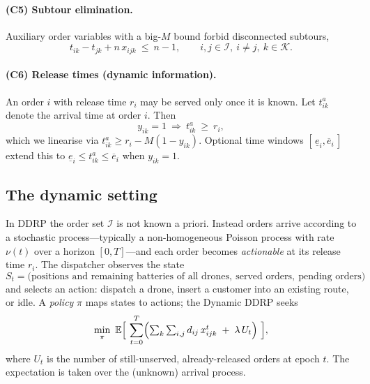 \documentclass[11pt,a4paper]{article}
\newcommand{\E}{\mathbb{E}}
\begin{document}
\paragraph{(C5) Subtour elimination.}
Auxiliary order variables with a big-$M$ bound forbid disconnected subtours,
\begin{equation}
  t_{ik} - t_{jk} + n\,x_{ijk} \ \le \ n-1,
  \qquad i,j\in\mathcal{I},\ i\neq j,\ k\in\mathcal{K}.
  \label{eq:ddrp-mtz}
\end{equation}

\paragraph{(C6) Release times (dynamic information).}
An order $i$ with release time $r_{i}$ may be served only once it is known. Let
$t^{a}_{ik}$ denote the arrival time at order $i$. Then
\begin{equation}
  y_{ik} = 1 \ \Rightarrow \ t^{a}_{ik} \ \ge \ r_{i},
  \label{eq:ddrp-release}
\end{equation}
which we linearise via $t^{a}_{ik} \ge r_{i} - M(1-y_{ik})$. Optional time
windows $[\,\underline{e}_{i},\overline{e}_{i}\,]$ extend this to
$\underline{e}_{i} \le t^{a}_{ik} \le \overline{e}_{i}$ when $y_{ik}=1$.

\subsection{The dynamic setting}

In DDRP the order set $\mathcal{I}$ is not known a priori. Instead orders
arrive according to a stochastic process---typically a non-homogeneous Poisson
process with rate $\nu(t)$ over a horizon $[0,T]$---and each order becomes
\emph{actionable} at its release time $r_{i}$. The dispatcher observes the
state
\[
  S_{t} = \bigl(\text{positions and remaining batteries of all drones},\
          \text{served orders},\ \text{pending orders}\bigr)
\]
and selects an action: dispatch a drone, insert a customer into an existing
route, or idle. A \emph{policy} $\pi$ maps states to actions; the Dynamic DDRP
seeks
\begin{equation}
  \min_{\pi} \ \E\Bigl[ \ \sum_{t=0}^{T}
      \Bigl( \textstyle\sum_{k}\sum_{i,j} d_{ij}\,x_{ijk}^{t}
             \;+\; \lambda\, U_{t} \Bigr) \ \Bigr],
  \label{eq:ddrp-dynamic}
\end{equation}
where $U_{t}$ is the number of still-unserved, already-released orders at epoch
$t$. The expectation is taken over the (unknown) arrival process.
\end{document}
